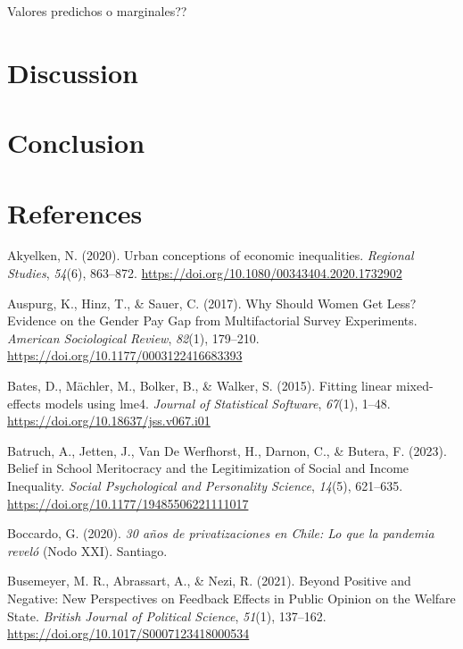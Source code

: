 \documentclass[
  12pt,
]{article}
\newlength{\cslhangindent}
\newenvironment{CSLReferences}[2] %
 {\begin{list}{}{%
  \setlength{\itemindent}{0pt}
  \setlength{\leftmargin}{0pt}
  \setlength{\parsep}{0pt}
  \ifodd #1
   \setlength{\leftmargin}{\cslhangindent}
   \setlength{\itemindent}{-1\cslhangindent}
  \fi
  \setlength{\itemsep}{#2\baselineskip}}}
 {\end{list}}
\begin{document}
Valores predichos o marginales??

\section{Discussion}\label{discussion}

\section{Conclusion}\label{conclusion}

\section{References}\label{references}

\label{refs}
\begin{CSLReferences}{1}{0}
Akyelken, N. (2020). Urban conceptions of economic inequalities.
\emph{Regional Studies}, \emph{54}(6), 863--872.
\url{https://doi.org/10.1080/00343404.2020.1732902}

Auspurg, K., Hinz, T., \& Sauer, C. (2017). Why {Should Women Get Less}?
{Evidence} on the {Gender Pay Gap} from {Multifactorial Survey
Experiments}. \emph{American Sociological Review}, \emph{82}(1),
179--210. \url{https://doi.org/10.1177/0003122416683393}

Bates, D., Mächler, M., Bolker, B., \& Walker, S. (2015). Fitting linear
mixed-effects models using {lme4}. \emph{Journal of Statistical
Software}, \emph{67}(1), 1--48.
\url{https://doi.org/10.18637/jss.v067.i01}

Batruch, A., Jetten, J., Van De Werfhorst, H., Darnon, C., \& Butera, F.
(2023). Belief in {School Meritocracy} and the {Legitimization} of
{Social} and {Income Inequality}. \emph{Social Psychological and
Personality Science}, \emph{14}(5), 621--635.
\url{https://doi.org/10.1177/19485506221111017}

Boccardo, G. (2020). \emph{30 a{ñ}os de privatizaciones en {Chile}: Lo
que la pandemia revel{ó}} (Nodo XXI). Santiago.

Busemeyer, M. R., Abrassart, A., \& Nezi, R. (2021). Beyond {Positive}
and {Negative}: {New Perspectives} on {Feedback Effects} in {Public
Opinion} on the {Welfare State}. \emph{British Journal of Political
Science}, \emph{51}(1), 137--162.
\url{https://doi.org/10.1017/S0007123418000534}


\end{CSLReferences}
\end{document}
